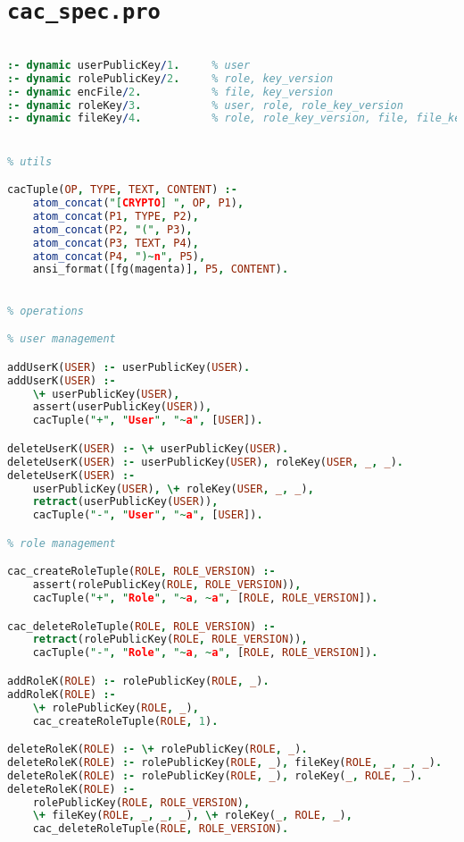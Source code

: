 \section{\texttt{cac_spec.pro}}
\label{app:prologcode.cac}

\setcode
\begin{lstlisting}[language=Prolog]
% dynamic predicates

:- dynamic userPublicKey/1.     % user
:- dynamic rolePublicKey/2.     % role, key_version
:- dynamic encFile/2.           % file, key_version
:- dynamic roleKey/3.           % user, role, role_key_version
:- dynamic fileKey/4.           % role, role_key_version, file, file_key_version


% utils

cacTuple(OP, TYPE, TEXT, CONTENT) :-
    atom_concat("[CRYPTO] ", OP, P1),
    atom_concat(P1, TYPE, P2),
    atom_concat(P2, "(", P3),
    atom_concat(P3, TEXT, P4),
    atom_concat(P4, ")~n", P5),
    ansi_format([fg(magenta)], P5, CONTENT).
    

% operations

% user management

addUserK(USER) :- userPublicKey(USER).
addUserK(USER) :- 
    \+ userPublicKey(USER),
    assert(userPublicKey(USER)),
    cacTuple("+", "User", "~a", [USER]).

deleteUserK(USER) :- \+ userPublicKey(USER).
deleteUserK(USER) :- userPublicKey(USER), roleKey(USER, _, _).
deleteUserK(USER) :-
    userPublicKey(USER), \+ roleKey(USER, _, _),                        % checks
    retract(userPublicKey(USER)),
    cacTuple("-", "User", "~a", [USER]).

% role management

cac_createRoleTuple(ROLE, ROLE_VERSION) :-
    assert(rolePublicKey(ROLE, ROLE_VERSION)),
    cacTuple("+", "Role", "~a, ~a", [ROLE, ROLE_VERSION]).

cac_deleteRoleTuple(ROLE, ROLE_VERSION) :-
    retract(rolePublicKey(ROLE, ROLE_VERSION)),
    cacTuple("-", "Role", "~a, ~a", [ROLE, ROLE_VERSION]).

addRoleK(ROLE) :- rolePublicKey(ROLE, _).
addRoleK(ROLE) :-
    \+ rolePublicKey(ROLE, _),
    cac_createRoleTuple(ROLE, 1).

deleteRoleK(ROLE) :- \+ rolePublicKey(ROLE, _).
deleteRoleK(ROLE) :- rolePublicKey(ROLE, _), fileKey(ROLE, _, _, _).
deleteRoleK(ROLE) :- rolePublicKey(ROLE, _), roleKey(_, ROLE, _).
deleteRoleK(ROLE) :-
    rolePublicKey(ROLE, ROLE_VERSION), 
    \+ fileKey(ROLE, _, _, _), \+ roleKey(_, ROLE, _),
    cac_deleteRoleTuple(ROLE, ROLE_VERSION).



\end{lstlisting}

